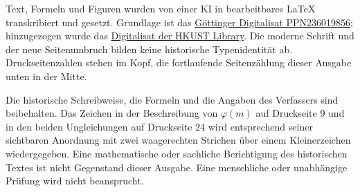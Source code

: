 Text, Formeln und Figuren wurden von einer KI in bearbeitbares LaTeX transkribiert und gesetzt. Grundlage ist das \href{https://gdz.sub.uni-goettingen.de/id/PPN236019856}{Göttinger Digitalisat PPN236019856}; hinzugezogen wurde das \href{https://lbezone.hkust.edu.hk/obj/4/o/b761099/v10,2/pg00009.jpg}{Digitalisat der HKUST Library}. Die moderne Schrift und der neue Seitenumbruch bilden keine historische Typenidentität ab. Druckseitenzahlen stehen im Kopf, die fortlaufende Seitenzählung dieser Ausgabe unten in der Mitte.

Die historische Schreibweise, die Formeln und die Angaben des Verfassers sind beibehalten. Das Zeichen in der Beschreibung von \(\varphi(m)\) auf Druckseite 9 und in den beiden Ungleichungen auf Druckseite 24 wird entsprechend seiner sichtbaren Anordnung mit zwei waagerechten Strichen über einem Kleinerzeichen wiedergegeben. Eine mathematische oder sachliche Berichtigung des historischen Textes ist nicht Gegenstand dieser Ausgabe. Eine menschliche oder unabhängige Prüfung wird nicht beansprucht.

